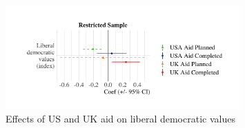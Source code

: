 \documentclass[9pt]{article}
\begin{document}
\begin{figure}[H]
\centering
\includegraphics[width=0.8\textwidth]{figures/figure_a21.png}
\caption{Effects of US and UK aid on liberal democratic values}
\end{figure}
\end{document}
